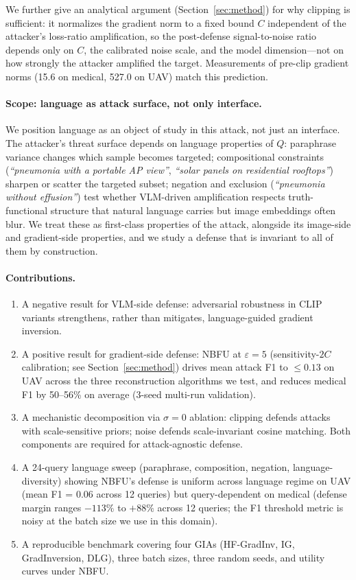 \documentclass[11pt]{article}
\begin{document}
We further give an analytical argument (Section~\ref{sec:method}) for why clipping is sufficient: it normalizes the gradient norm to a fixed bound $C$ independent of the attacker's loss-ratio amplification, so the post-defense signal-to-noise ratio depends only on $C$, the calibrated noise scale, and the model dimension---not on how strongly the attacker amplified the target. Measurements of pre-clip gradient norms (15.6 on medical, 527.0 on UAV) match this prediction.

\paragraph{Scope: language as attack surface, not only interface.}
We position language as an object of study in this attack, not just an interface. The attacker's threat surface depends on language properties of $Q$: paraphrase variance changes which sample becomes targeted; compositional constraints (\textit{``pneumonia with a portable AP view''}, \textit{``solar panels on residential rooftops''}) sharpen or scatter the targeted subset; negation and exclusion (\textit{``pneumonia without effusion''}) test whether VLM-driven amplification respects truth-functional structure that natural language carries but image embeddings often blur. We treat these as first-class properties of the attack, alongside its image-side and gradient-side properties, and we study a defense that is invariant to all of them by construction.

\paragraph{Contributions.}
\begin{enumerate}
\itemsep0pt
    \item A negative result for VLM-side defense: adversarial robustness in CLIP variants strengthens, rather than mitigates, language-guided gradient inversion.
    \item A positive result for gradient-side defense: NBFU at $\varepsilon{=}5$ (sensitivity-$2C$ calibration; see Section~\ref{sec:method}) drives mean attack F1 to $\le 0.13$ on UAV across the three reconstruction algorithms we test, and reduces medical F1 by 50--56\% on average (3-seed multi-run validation).
    \item A mechanistic decomposition via $\sigma{=}0$ ablation: clipping defends attacks with scale-sensitive priors; noise defends scale-invariant cosine matching. Both components are required for attack-agnostic defense.
    \item A 24-query language sweep (paraphrase, composition, negation, language-diversity) showing NBFU's defense is uniform across language regime on UAV (mean F1 = 0.06 across 12 queries) but query-dependent on medical (defense margin ranges $-113\%$ to $+88\%$ across 12 queries; the F1 threshold metric is noisy at the batch size we use in this domain).
    \item A reproducible benchmark covering four GIAs (HF-GradInv, IG, GradInversion, DLG), three batch sizes, three random seeds, and utility curves under NBFU.
\end{enumerate}
\end{document}
